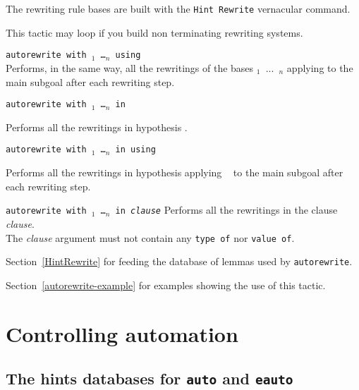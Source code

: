 \begin{coq_example*}
The rewriting rule bases are built with the {\tt Hint~Rewrite} vernacular
command.

\Warning{} This tactic may loop if you build non terminating rewriting systems.

\begin{Variant}
\item {\tt autorewrite with \ident$_1$ \dots \ident$_n$ using \tac}\\
Performs, in the same way, all the rewritings of the bases {\tt \ident$_1$ $...$
\ident$_n$} applying {\tt \tac} to the main subgoal after each rewriting step.

\item \texttt{autorewrite with {\ident$_1$} \dots \ident$_n$ in {\qualid}}

  Performs all the rewritings in hypothesis {\qualid}.
\item \texttt{autorewrite with {\ident$_1$} \dots \ident$_n$ in {\qualid} using \tac}

  Performs all  the rewritings  in hypothesis {\qualid}  applying {\tt
    \tac} to the main subgoal after each rewriting step.

\item \texttt{autorewrite with {\ident$_1$} \dots \ident$_n$ in \textit{clause}}
  Performs all  the rewritings  in the clause \textit{clause}. \\
  The  \textit{clause} argument must  not contain  any \texttt{type  of} nor  \texttt{value  of}.

\end{Variant}

\SeeAlso Section~\ref{HintRewrite} for feeding the database of lemmas used by {\tt autorewrite}.

\SeeAlso Section~\ref{autorewrite-example} for examples showing the use of
this tactic.


\section{Controlling automation}

\subsection{The hints databases for {\tt auto} and {\tt eauto}
\label{Hints-databases}
}


\end{coq_example*}
